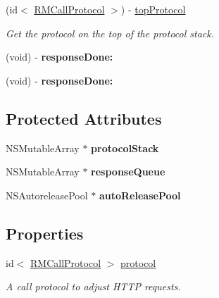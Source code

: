 \begin{DoxyCompactItemize}
(id$<$ \hyperlink{protocol_r_m_call_protocol-p}{RMCallProtocol} $>$) -\/ \hyperlink{interface_r_m_call_a306021de3467cc71a876068cbed9d834}{topProtocol}
\begin{DoxyCompactList}\small\item\em Get the protocol on the top of the protocol stack. \item\end{DoxyCompactList}\item 
\hypertarget{interface_r_m_call_ad886fa1609a87c68a5d681942704e61d}{
(void) -\/ {\bfseries responseDone:}}
\label{interface_r_m_call_ad886fa1609a87c68a5d681942704e61d}

\item 
\hypertarget{interface_r_m_call_ad886fa1609a87c68a5d681942704e61d}{
(void) -\/ {\bfseries responseDone:}}
\label{interface_r_m_call_ad886fa1609a87c68a5d681942704e61d}

\end{DoxyCompactItemize}
\subsection*{Protected Attributes}
\begin{DoxyCompactItemize}
\item 
\hypertarget{interface_r_m_call_af082e641c263aa410c5195084153e03b}{
NSMutableArray $\ast$ {\bfseries protocolStack}}
\label{interface_r_m_call_af082e641c263aa410c5195084153e03b}

\item 
\hypertarget{interface_r_m_call_ab5d202e25515a602bac16ab028336a89}{
NSMutableArray $\ast$ {\bfseries responseQueue}}
\label{interface_r_m_call_ab5d202e25515a602bac16ab028336a89}

\item 
\hypertarget{interface_r_m_call_a98a195cf89cf282dc613f6573c238d2d}{
NSAutoreleasePool $\ast$ {\bfseries autoReleasePool}}
\label{interface_r_m_call_a98a195cf89cf282dc613f6573c238d2d}

\end{DoxyCompactItemize}
\subsection*{Properties}
\begin{DoxyCompactItemize}
\item 
\hypertarget{interface_r_m_call_ae96906f15a63ea2680d57eccef568944}{
id$<$ \hyperlink{protocol_r_m_call_protocol-p}{RMCallProtocol} $>$ \hyperlink{interface_r_m_call_ae96906f15a63ea2680d57eccef568944}{protocol}}
\label{interface_r_m_call_ae96906f15a63ea2680d57eccef568944}

\begin{DoxyCompactList}\small\item\em A call protocol to adjust HTTP requests. \item\end{DoxyCompactList}\end{DoxyCompactItemize}


